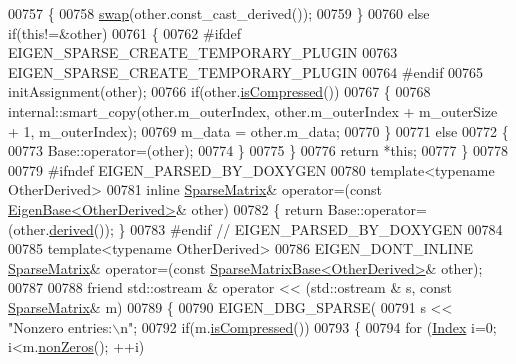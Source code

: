 \begin{DoxyCode}
00757       \{
00758         \hyperlink{endian_8c_a3ca5ecd34b04d6a243c054ac3a57f68d}{swap}(other.const\_cast\_derived());
00759       \}
00760       \textcolor{keywordflow}{else} \textcolor{keywordflow}{if}(\textcolor{keyword}{this}!=&other)
00761       \{
00762 \textcolor{preprocessor}{        #ifdef EIGEN\_SPARSE\_CREATE\_TEMPORARY\_PLUGIN}
00763           EIGEN\_SPARSE\_CREATE\_TEMPORARY\_PLUGIN
00764 \textcolor{preprocessor}{        #endif}
00765         initAssignment(other);
00766         \textcolor{keywordflow}{if}(other.\hyperlink{group___sparse_core___module_a837934b33a80fe996ff20500373d3a61}{isCompressed}())
00767         \{
00768           internal::smart\_copy(other.m\_outerIndex, other.m\_outerIndex + m\_outerSize + 1, m\_outerIndex);
00769           m\_data = other.m\_data;
00770         \}
00771         \textcolor{keywordflow}{else}
00772         \{
00773           Base::operator=(other);
00774         \}
00775       \}
00776       \textcolor{keywordflow}{return} *\textcolor{keyword}{this};
00777     \}
00778 
00779 \textcolor{preprocessor}{#ifndef EIGEN\_PARSED\_BY\_DOXYGEN}
00780     \textcolor{keyword}{template}<\textcolor{keyword}{typename} OtherDerived>
00781     \textcolor{keyword}{inline} \hyperlink{group___sparse_core___module_class_eigen_1_1_sparse_matrix}{SparseMatrix}& operator=(\textcolor{keyword}{const} \hyperlink{group___core___module_struct_eigen_1_1_eigen_base}{EigenBase<OtherDerived>}& other)
00782     \{ \textcolor{keywordflow}{return} Base::operator=(other.\hyperlink{group___core___module_a324b16961a11d2ecfd2d1b7dd7946545}{derived}()); \}
00783 \textcolor{preprocessor}{#endif // EIGEN\_PARSED\_BY\_DOXYGEN}
00784 
00785     \textcolor{keyword}{template}<\textcolor{keyword}{typename} OtherDerived>
00786     EIGEN\_DONT\_INLINE \hyperlink{group___sparse_core___module_class_eigen_1_1_sparse_matrix}{SparseMatrix}& operator=(\textcolor{keyword}{const} 
      \hyperlink{group___sparse_core___module_class_eigen_1_1_sparse_matrix_base}{SparseMatrixBase<OtherDerived>}& other);
00787 
00788     \textcolor{keyword}{friend} std::ostream & operator << (std::ostream & s, \textcolor{keyword}{const} \hyperlink{group___sparse_core___module_class_eigen_1_1_sparse_matrix}{SparseMatrix}& m)
00789     \{
00790       EIGEN\_DBG\_SPARSE(
00791         s << \textcolor{stringliteral}{"Nonzero entries:\(\backslash\)n"};
00792         \textcolor{keywordflow}{if}(m.\hyperlink{group___sparse_core___module_a837934b33a80fe996ff20500373d3a61}{isCompressed}())
00793         \{
00794           \textcolor{keywordflow}{for} (\hyperlink{group___core___module_a554f30542cc2316add4b1ea0a492ff02}{Index} i=0; i<m.\hyperlink{group___sparse_core___module_a03de8b3da2c142ce8698a76123b3e7d3}{nonZeros}(); ++i)

\end{DoxyCode}
